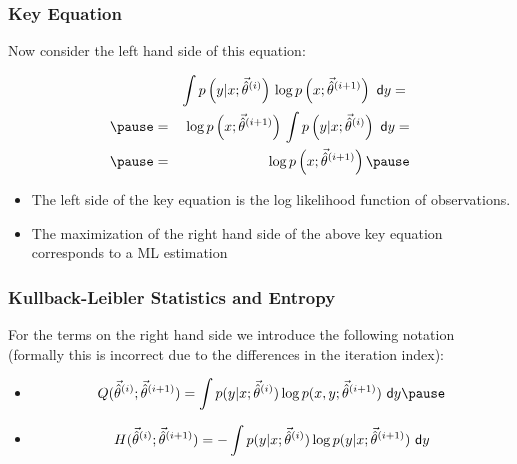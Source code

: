 \begin{frame}
  \frametitle{Key Equation \cont}
  
  Now consider the left hand side of this equation:
  
  \begin{eqnarray*}
          & & \int p\left(y|x ; \hatp^{(i)}   \right) \, \log p\left( x ; \hatp^{(i+1)} \right)\ \mathsf{d}y ={} \\ \pause
          &=& \log p\left(x   ; \hatp^{(i+1)} \right) \, \int p\left( y|x ; \hatp^{(i)} \right)\ \mathsf{d}y = \\ \pause
          &=& \log p\left(x   ; \hatp^{(i+1)} \right) \pause
  \end{eqnarray*}
  
  \begin{itemize}
    \item {} The left side of the key equation is the log likelihood function of observations. \\[.3cm] \pause 
    \item {} The maximization of the right hand side of the above key equation corresponds to a ML estimation
  \end{itemize}
\end{frame}


\begin{frame}
  \frametitle{Kullback-Leibler Statistics and Entropy}
  
  For the terms on the right hand side we introduce the following notation \\
  (formally this is incorrect due to the differences in the iteration index):
  
  \begin{itemize}
    \item {}
      \begin{displaymath}
        Q(\hatp^{(i)};\hatp^{(i+1)}) =
        \int p(y|x; \hatp^{(i)}) \log p(x, y;\hatp^{(i+1)}) \ \mathsf{d}y \pause
      \end{displaymath}
   \item {}
     \begin{displaymath}
       H(\hatp^{(i)};\hatp^{(i+1)}) = 
       - \int p(y|x; \hatp^{(i)}) \log p(y|x; \hatp^{(i+1)})\ \mathsf{d}y
      \end{displaymath}
  \end{itemize}
\end{frame}


